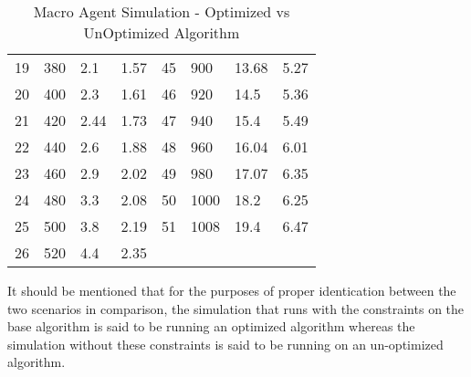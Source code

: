\begin{table}[H]
\begin{adjustbox}{angle=270}
{\begin{tabular}{|l|l|l|l|l|l|l|l|}
19                                    & 380      & 2.1                        & 1.57                         & 45                                    & 900      & 13.68                      & 5.27                          \\
20                                    & 400      & 2.3                        & 1.61                         & 46                                    & 920      & 14.5                       & 5.36                          \\
21                                    & 420      & 2.44                       & 1.73                         & 47                                    & 940      & 15.4                       & 5.49                          \\
22                                    & 440      & 2.6                        & 1.88                         & 48                                    & 960      & 16.04                      & 6.01                          \\
23                                    & 460      & 2.9                        & 2.02                         & 49                                    & 980      & 17.07                      & 6.35                          \\
24                                    & 480      & 3.3                        & 2.08                         & 50                                    & 1000     & 18.2                       & 6.25                          \\
25                                    & 500      & 3.8                        & 2.19                         & 51                                    & 1008     & 19.4                       & 6.47                          \\
26                                    & 520      & 4.4                        & 2.35                         &                                       &          &                            &                               \\
\hline
\end{tabular}}
\end{adjustbox}
\caption{Macro Agent Simulation - Optimized vs UnOptimized Algorithm}
\label{Macro Agent Simulation - Optimized vs UnOptimized Algorithm}
\end{table}

It should be mentioned that for the purposes of proper identication between the two scenarios in comparison, the simulation that runs with the constraints on the base algorithm is said to be running an optimized algorithm whereas the simulation without these constraints is said to be running on an un-optimized algorithm. 

